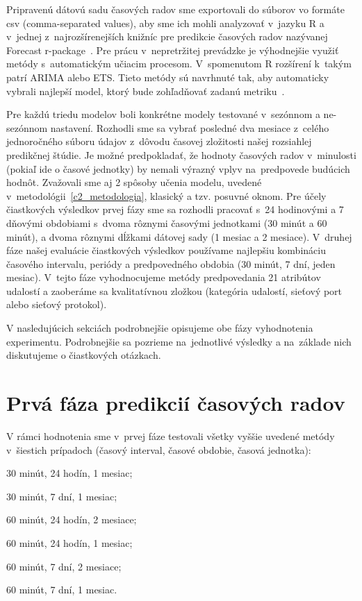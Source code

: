 \documentclass[thesismargins, thesislinespacing, openright, upjsfrontpage]{rnthesis}
\begin{document}
Pripravenú dátovú sadu časových radov sme exportovali do súborov vo formáte csv (comma-separated values), aby sme ich mohli analyzovať v~jazyku R a v~jednej z~najrozšírenejších knižníc pre predikcie časových radov nazývanej Forecast r-package~\cite{hyndman2007automatic}. Pre prácu v~nepretržitej prevádzke je výhodnejšie využiť metódy s~automatickým učiacim procesom. V~spomenutom R rozšírení k~takým patrí ARIMA alebo ETS. Tieto metódy sú navrhnuté tak, aby automaticky vybrali najlepší model, ktorý bude zohľadňovať zadanú metriku~\cite{hyndman2007automatic}.

Pre každú triedu modelov boli konkrétne modely testované v~sezónnom a ne-sezónnom nastavení. Rozhodli sme sa vybrať posledné dva mesiace z~celého jednoročného súboru údajov z~dôvodu časovej zložitosti našej rozsiahlej predikčnej štúdie. Je možné predpokladať, že hodnoty časových radov v~minulosti (pokiaľ ide o časové jednotky) by nemali výrazný vplyv na~predpovede budúcich hodnôt. Zvažovali sme aj 2 spôsoby učenia modelu, uvedené v~metodológii~\ref{c2_metodologia}, klasický a tzv. posuvné oknom. Pre účely čiastkových výsledkov prvej fázy sme sa rozhodli pracovať s~24 hodinovými a 7 dňovými obdobiami s~dvoma rôznymi časovými jednotkami (30 minút a 60 minút), a dvoma rôznymi dĺžkami dátovej sady (1 mesiac a 2 mesiace). V~druhej fáze našej evaluácie čiastkových výsledkov používame najlepšiu kombináciu časového intervalu, periódy a predpovedného obdobia (30 minút, 7 dní, jeden mesiac). V~tejto fáze vyhodnocujeme metódy predpovedania 21 atribútov udalostí a zaoberáme sa kvalitatívnou zložkou (kategória udalostí, sieťový port alebo sieťový protokol).

V nasledujúcich sekciách podrobnejšie opisujeme obe fázy vyhodnotenia experimentu. Podrobnejšie sa pozrieme na~jednotlivé výsledky a na~základe nich diskutujeme o čiastkových otázkach.

\section{Prvá fáza predikcií časových radov}

V rámci hodnotenia sme v~prvej fáze testovali všetky vyššie uvedené metódy v~šiestich prípadoch (časový interval, časové obdobie, časová jednotka): 
\begin{compactenum}
    \item 30 minút, 24 hodín, 1 mesiac; 
    \item 30 minút, 7 dní, 1 mesiac; 
    \item 60 minút, 24 hodín, 2 mesiace; 
    \item 60 minút, 24 hodín, 1 mesiac; 
    \item 60 minút, 7 dní, 2 mesiace; 
    \item 60 minút, 7 dní, 1 mesiac.
\end{compactenum}
\end{document}
